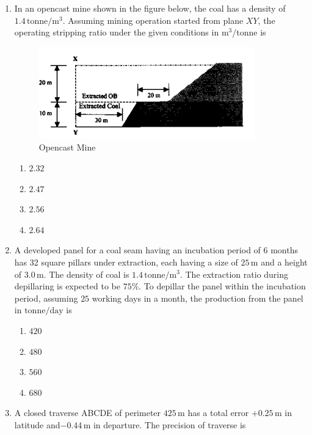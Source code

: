 \documentclass[journal,12pt,onecolumn]{IEEEtran}
\theoremstyle{remark}
\begin{document}
\begin{enumerate}
\item In an opencast mine shown in the figure below, the coal has a density of $1.4\, \mathrm{tonne}/\mathrm{m}^3$. Assuming
mining operation started from plane $XY$, the operating stripping ratio under the given conditions in 
$\mathrm{m^3}/\mathrm{tonne}$ is

\hfill{}
\begin{figure}[H]
  \centering
  \includegraphics[width=0.4\columnwidth]{figs/37.png}
  \caption{Opencast Mine}
  \label{fig:37}
\end{figure}
\begin{multicols}{4}
\begin{enumerate}
\item $ 2.32$
\item $ 2.47$
\item $ 2.56$
\item $ 2.64$
\end{enumerate}
\end{multicols}

\item A developed panel for a coal seam having an incubation period of 6 months has 32 square pillars 
under extraction, each having a size of $25\,\mathrm{m}$ and a height of $3.0\,\mathrm{m}$. 
The density of coal is $1.4\,\mathrm{tonne/m^3}$. The extraction ratio during depillaring is expected to be $75\%$. 
To depillar the panel within the incubation period, assuming $25$ working days in a month, the production from  the panel in $\mathrm{tonne/day}$ is

\hfill{}
\begin{multicols}{4}
\begin{enumerate}
\item $420$
\item $480$
\item $560$
\item $680$
\end{enumerate}
\end{multicols}

\item A closed traverse ABCDE of perimeter $425\,\mathrm{m}$ has a total error $+0.25\,\mathrm{m}$ in latitude and$-0.44\,\mathrm{m}$ in departure. The precision of traverse is


\end{enumerate}
\end{document}

